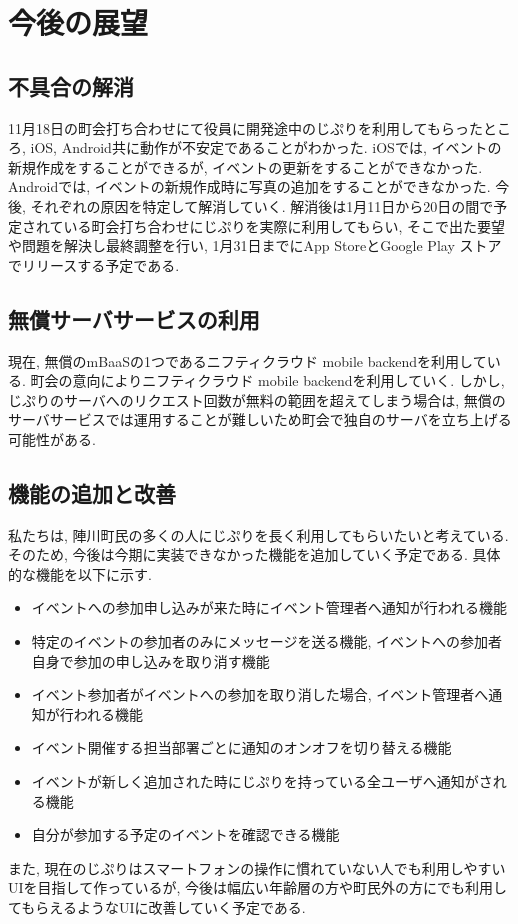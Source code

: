 \chapter{今後の展望}

\section{不具合の解消}
11月18日の町会打ち合わせにて役員に開発途中のじぷりを利用してもらったところ, iOS,  Android共に動作が不安定であることがわかった.
iOSでは, イベントの新規作成をすることができるが, イベントの更新をすることができなかった. Androidでは, イベントの新規作成時に写真の追加をすることができなかった.
今後, それぞれの原因を特定して解消していく. 解消後は1月11日から20日の間で予定されている町会打ち合わせにじぷりを実際に利用してもらい, そこで出た要望や問題を解決し最終調整を行い, 1月31日までにApp StoreとGoogle Play ストアでリリースする予定である.

\section{無償サーバサービスの利用}
現在, 無償のmBaaSの1つであるニフティクラウド mobile backendを利用している. 町会の意向によりニフティクラウド mobile backendを利用していく. しかし, じぷりのサーバへのリクエスト回数が無料の範囲を超えてしまう場合は,
無償のサーバサービスでは運用することが難しいため町会で独自のサーバを立ち上げる可能性がある.

\section{機能の追加と改善}
私たちは, 陣川町民の多くの人にじぷりを長く利用してもらいたいと考えている. そのため, 今後は今期に実装できなかった機能を追加していく予定である. 具体的な機能を以下に示す.
\begin{itemize}
    \item イベントへの参加申し込みが来た時にイベント管理者へ通知が行われる機能
    \item 特定のイベントの参加者のみにメッセージを送る機能, イベントへの参加者自身で参加の申し込みを取り消す機能
    \item イベント参加者がイベントへの参加を取り消した場合, イベント管理者へ通知が行われる機能
    \item イベント開催する担当部署ごとに通知のオンオフを切り替える機能
    \item イベントが新しく追加された時にじぷりを持っている全ユーザへ通知がされる機能
    \item 自分が参加する予定のイベントを確認できる機能
\end{itemize}
また, 現在のじぷりはスマートフォンの操作に慣れていない人でも利用しやすいUIを目指して作っているが,
今後は幅広い年齢層の方や町民外の方にでも利用してもらえるようなUIに改善していく予定である.
